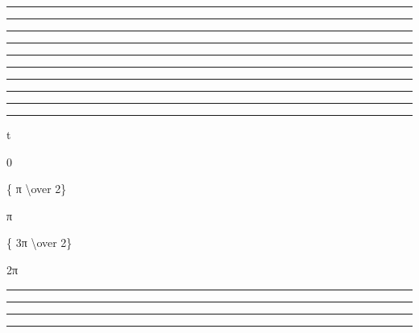 \documentclass[]{article}
\begin{document}
\begin{center}\rule{3in}{0.4pt}\end{center}

\begin{center}\rule{3in}{0.4pt}\end{center}

\begin{center}\rule{3in}{0.4pt}\end{center}

\begin{center}\rule{3in}{0.4pt}\end{center}

\begin{center}\rule{3in}{0.4pt}\end{center}

\begin{center}\rule{3in}{0.4pt}\end{center}

\begin{center}\rule{3in}{0.4pt}\end{center}

\begin{center}\rule{3in}{0.4pt}\end{center}

\begin{center}\rule{3in}{0.4pt}\end{center}

\begin{center}\rule{3in}{0.4pt}\end{center}

t

0

\{ π \textbackslash{}over 2\}

π

\{ 3π \textbackslash{}over 2\}

2π

\begin{center}\rule{3in}{0.4pt}\end{center}

\begin{center}\rule{3in}{0.4pt}\end{center}

\begin{center}\rule{3in}{0.4pt}\end{center}

\begin{center}\rule{3in}{0.4pt}\end{center}
\end{document}
